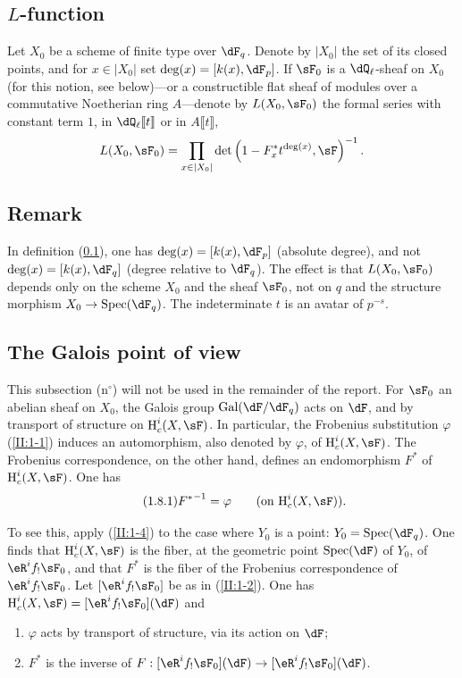 \subsection{\texorpdfstring{$L$}{L}-function}\label{II:1-6}

Let $X_0$ be a scheme of finite type over $\dF_q$. Denote by $|X_0|$ the set
of its closed points, and for $x\in |X_0|$ set
$\deg(x)=[k(x),\dF_p]$. If $\sF_0$ is a $\dQ_\ell$-sheaf on $X_0$ (for this
notion, see below)---or a constructible flat sheaf of modules over a
commutative Noetherian ring $A$---denote by $L(X_0,\sF_0)$ the formal series
with constant term $1$, in $\dQ_\ell\llbracket t\rrbracket$ or in
$A\llbracket t\rrbracket$,
\[
  L(X_0,\sF_0) = \prod_{x\in|X_0|} \det\left(1-F_x^* t^{\deg(x)},\sF\right)^{-1} \text{.}
\]






\subsection{Remark}\label{II:1-7}

In definition (\ref{II:1-6}), one has $\deg(x)=[k(x),\dF_p]$ (absolute
degree), and not $\deg(x)=[k(x),\dF_q]$ (degree relative to $\dF_q$). The
effect is that $L(X_0,\sF_0)$ depends only on the scheme $X_0$ and the sheaf
$\sF_0$, not on $q$ and the structure morphism
$X_0\to\spec(\dF_q)$. The indeterminate $t$ is an avatar of $p^{-s}$.






\subsection{The Galois point of view}\label{II:1-8}

This subsection (n$^\circ$) will not be used in the remainder of the report. For $\sF_0$
an abelian sheaf on $X_0$, the Galois group $\gal(\dF/\dF_q)$ acts on
$\dF$, and by transport of structure on $\h_c^i(X,\sF)$. In particular, the
Frobenius substitution $\varphi$ (\ref{II:1-1}) induces an automorphism, also
denoted by $\varphi$, of $\h_c^i(X,\sF)$. The Frobenius correspondence, on the
other hand, defines an endomorphism $F^*$ of $\h_c^i(X,\sF)$. One has
\begin{equation*}\tag{1.8.1}\label{II:eq:1-8-1}
  {F^*}^{-1} = \varphi \qquad \text{(on $\h_c^i(X,\sF)$).}
\end{equation*}

To see this, apply (\ref{II:1-4}) to the case where $Y_0$ is a point:
$Y_0=\spec(\dF_q)$. One finds that $\h_c^i(X,\sF)$ is the fiber, at the
geometric point $\spec(\dF)$ of $Y_0$, of $\eR^i f_! \sF_0$, and that $F^*$
is the fiber of the Frobenius correspondence of $\eR^i f_!\sF_0$. Let
$[\eR^i f_! \sF_0]$ be as in (\ref{II:1-2}). One has
$\h_c^i(X,\sF) = [\eR^i f_!\sF_0](\dF)$ and
\begin{enumerate}[\indent a)]
  \item $\varphi$ acts by transport of structure, via its action on $\dF$;
  \item $F^*$ is the inverse of
    $F:[\eR^i f_!\sF_0](\dF) \to [\eR^i f_!\sF_0](\dF)$.
\end{enumerate}

